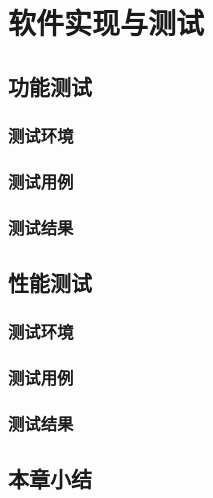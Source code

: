 \chapter{软件实现与测试}

\section{功能测试}
\subsection{测试环境}
\subsection{测试用例}
\subsection{测试结果}

\section{性能测试}
\subsection{测试环境}
\subsection{测试用例}
\subsection{测试结果}

\section{本章小结}